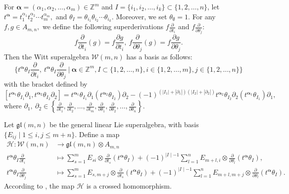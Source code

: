 \documentclass[11pt]{amsart}
\newcommand{\bbZ}{\mathbb{Z}}
\theoremstyle{definition}
\numberwithin{equation}{section}
\begin{document}
For $\boldsymbol{\alpha}=(\alpha_1,\alpha_2,\dots,\alpha_m)\in \bbZ^{m}$ and $I=\{i_1,i_2,\dots, i_k\} \subset \{1,2,\dots,n\}$, let $t^{\boldsymbol{\alpha}}=t_1^{\alpha_1}  t_2^{\alpha_2}\cdots t_m^{\alpha_m},$ and ${\theta}_{I}=\theta_{i_1} \theta_{i_2}\cdots \theta_{i_k}.$ Moreover, we set $\theta_{\emptyset}=1.$ For any $f,g\in A_{m,n},$ we define the following superderivations $f\frac{\partial}{\partial t_i}$ and $f\frac{\partial}{\partial \theta_j}$:
\[ f\frac{\partial}{\partial t_i}(g)=f\frac{\partial g}{\partial t_i}, \        f\frac{\partial}{\partial \theta_j}(g)=f\frac{\partial g}{\partial \theta_j}. \]
Then the Witt superalgebra $\mathcal{W}(m,n)$ has a basis as follows:
\[ \Big\{t^{\boldsymbol{\alpha}} \theta_{I} \frac{\partial}{\partial t_i}, \ t^{\boldsymbol{\alpha}} \theta_{I} \frac{\partial}{\partial \theta_j} \ | \ \boldsymbol{\alpha} \in \bbZ^{m}, I\subset  \{1,2,\dots,n\}, i \in \{1,2,\dots,m\}, j \in \{ 1,2, \dots,n\}  \Big\}        \]
with the bracket defined by 
\[ [t^{\boldsymbol{\alpha}_1} \theta_{I_1} \partial_1, t^{\boldsymbol{\alpha}_2} \theta_{I_2} \partial_2 ]= t^{\boldsymbol{\alpha}_1} \theta_{I_1} \partial_1(t^{\boldsymbol{\alpha}_2} \theta_{I_2}) \partial_2 -(-1)^{(|I_1|+|\partial_1|)(|I_2|+|\partial_2|)}     t^{\boldsymbol{\alpha}_2} \theta_{I_2} \partial_2 (t^{\boldsymbol{\alpha}_1} \theta_{I_1}) \partial_1,  \]
where $\partial_1, \  \partial_2 \in \left\{\frac{\partial}{\partial t_1}, \frac{\partial}{\partial t_2}, \dots, \frac{\partial}{\partial t_m}, \frac{\partial}{\partial \theta_1}, \frac{\partial}{\partial \theta_2}, \dots, \frac{\partial}{\partial \theta_n}\right\}.$
		
Let $\mathfrak{gl}(m,n)$ be the general linear Lie superalgebra, with basis $\{ E_{ij} \mid 1 \leq i,j \leq m+n \}$. 
Define a map 
\begin{align*}
\mathcal{H}: \mathcal{W}(m,n) &\rightarrow \mathfrak{gl}(m,n)\otimes A_{m,n} \\
t^{\boldsymbol{\alpha}}\theta_I\frac{\partial}{\partial t_i} & \mapsto \sum\limits_{s=1}^m E_{si}\otimes \frac{\partial}{\partial t_s}(t^{\boldsymbol{\alpha}}\theta_I) + (-1)^{\mid I \mid -1} \sum\limits_{l=1}^n E_{m+l,i}\otimes \frac{\partial}{\partial \theta_l}(t^{\boldsymbol{\alpha}}\theta_I),\\
t^{\boldsymbol{\alpha}}\theta_I\frac{\partial}{\partial \theta_j}& \mapsto \sum\limits_{s=1}^m E_{s,m+j}\otimes \frac{\partial}{\partial t_s}(t^{\boldsymbol{\alpha}}\theta_I) +(-1)^{\mid I \mid -1} \sum\limits_{l=1}^n E_{m+l,m+j}\otimes \frac{\partial}{\partial \theta_l}(t^{\boldsymbol{\alpha}}\theta_I). 
\end{align*}
According to \cite{LX23}, the map $\mathcal{H}$ is a crossed homomorphism.
		
\end{document}
